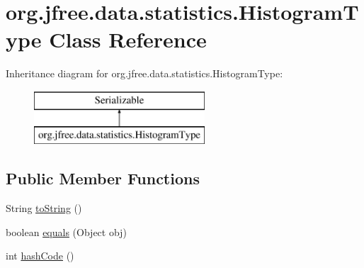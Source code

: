 \hypertarget{classorg_1_1jfree_1_1data_1_1statistics_1_1_histogram_type}{}\section{org.\+jfree.\+data.\+statistics.\+Histogram\+Type Class Reference}
\label{classorg_1_1jfree_1_1data_1_1statistics_1_1_histogram_type}
Inheritance diagram for org.\+jfree.\+data.\+statistics.\+Histogram\+Type\+:\begin{figure}[H]
\begin{center}
\leavevmode
\includegraphics[height=2.000000cm]{classorg_1_1jfree_1_1data_1_1statistics_1_1_histogram_type}
\end{center}
\end{figure}
\subsection*{Public Member Functions}
\begin{DoxyCompactItemize}
\item 
String \mbox{\hyperlink{classorg_1_1jfree_1_1data_1_1statistics_1_1_histogram_type_aad811872a20e758a41b70f6d65d4a891}{to\+String}} ()
\item 
boolean \mbox{\hyperlink{classorg_1_1jfree_1_1data_1_1statistics_1_1_histogram_type_aa153babad29d6397a5b0fd702d4f327b}{equals}} (Object obj)
\item 
int \mbox{\hyperlink{classorg_1_1jfree_1_1data_1_1statistics_1_1_histogram_type_a513177c9fe61117820b9561eecc6a528}{hash\+Code}} ()
\end{DoxyCompactItemize}
